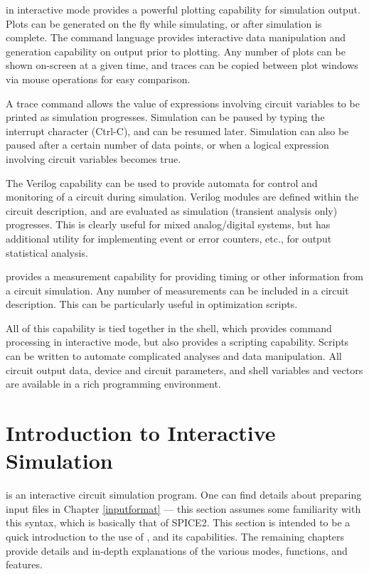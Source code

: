 {\WRspice} in interactive mode provides a powerful plotting capability
for simulation output.  Plots can be generated on the fly while
simulating, or after simulation is complete.  The command language
provides interactive data manipulation and generation capability on
output prior to plotting.  Any number of plots can be shown on-screen
at a given time, and traces can be copied between plot windows via
mouse operations for easy comparison.

A {\cb trace} command allows the value of expressions involving
circuit variables to be printed as simulation progresses.  Simulation
can be paused by typing the interrupt character ({\kb Ctrl-C}), and
can be resumed later.  Simulation can also be paused after a certain
number of data points, or when a logical expression involving circuit
variables becomes true.

The Verilog capability can be used to provide automata for control and
monitoring of a circuit during simulation.  Verilog modules are defined
within the circuit description, and are evaluated as simulation (transient
analysis only) progresses.  This is clearly useful for mixed analog/digital
systems, but has additional utility for implementing event or error
counters, etc., for output statistical analysis.

{\WRspice} provides a measurement capability for providing timing or
other information from a circuit simulation.  Any number of
measurements can be included in a circuit description.  This can be
particularly useful in optimization scripts.

All of this capability is tied together in the {\WRspice} shell, which
provides command processing in interactive mode, but also provides a
scripting capability.  Scripts can be written to automate complicated
analyses and data manipulation.  All circuit output data, device and
circuit parameters, and shell variables and vectors are available in
a rich programming environment.


\section{Introduction to Interactive Simulation}


{\WRspice} is an interactive circuit simulation program.  One can find
details about preparing {\WRspice} input files in Chapter
\ref{inputformat} --- this section assumes some familiarity with this
syntax, which is basically that of SPICE2.  This section is intended
to be a quick introduction to the use of {\WRspice}, and its
capabilities.  The remaining chapters provide details and in-depth
explanations of the various modes, functions, and features.

